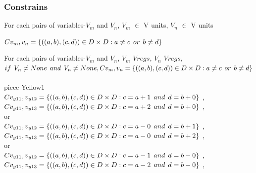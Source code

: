 \subsubsection{Constrains}
 For each pairs of variables-$V_{m}$ and $V_{n}$, $V_{m}$ $\in$ V units, $V_{n}$ $\in$ V units
\begin{center}
$Cv_{m},v_{n}=\{((a,b),(c,d))\in D\times D: a \neq c   \hspace{1ex} or \hspace{1ex}  b \neq d\}$
\end{center}
For each pairs of variables-$V_{m}$ and $V_{n}$, $V_{m}$ \in $V regs$, $V_{n}$ \in $V regs,$ \\
$if \hspace{1ex} V_{n} \neq None \hspace{1ex} and \hspace{1ex} V_{n} \neq None, Cv_{m},v_{n}=\{((a,b),(c,d))\in D\times D: a \neq c   \hspace{1ex} or \hspace{1ex}  b \neq d\}$\\
\\ piece Yellow1
\\$C{v_{y11},v_{y12}}=\{((a,b),(c,d))\in D\times D: c = a + 1\hspace{1ex} and \hspace{1ex}  d = b + 0 \}$ , 
\\$C{v_{y11},v_{y13}}=\{((a,b),(c,d))\in D\times D: c = a + 2\hspace{1ex} and \hspace{1ex}  d = b + 0 \}$ , 
\\or
\\$C{v_{y11},v_{y12}}=\{((a,b),(c,d))\in D\times D: c = a - 0\hspace{1ex} and \hspace{1ex}  d = b + 1 \}$ , 
\\$C{v_{y11},v_{y13}}=\{((a,b),(c,d))\in D\times D: c = a - 0\hspace{1ex} and \hspace{1ex}  d = b + 2 \}$ , 
\\or
\\$C{v_{y11},v_{y12}}=\{((a,b),(c,d))\in D\times D: c = a - 1\hspace{1ex} and \hspace{1ex}  d = b - 0 \}$ , 
\\$C{v_{y11},v_{y13}}=\{((a,b),(c,d))\in D\times D: c = a - 2\hspace{1ex} and \hspace{1ex}  d = b - 0 \}$ , 
